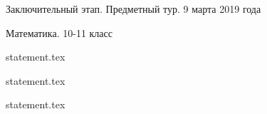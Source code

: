 \documentclass[a4paper,11pt, oneside]{book}
\begin{document}
\vspace{-3mm}
\vspace{-5mm}

\normalsize

\begin{center}
    Заключительный этап. Предметный тур. 9 марта 2019 года
    
    Математика. 10-11 класс
\end{center}

\parindent=0cm

{statement.tex}

{statement.tex}

{statement.tex}
\end{document}
